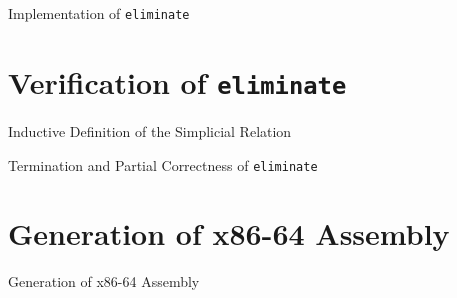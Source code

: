 \documentclass[aspectratio=169,xcolor=dvipsnames]{beamer}
\begin{document}
\begin{frame}{Implementation of \texttt{eliminate}}

\end{frame}

\section{Verification of \texttt{eliminate}}

\begin{frame}{Inductive Definition of the Simplicial Relation}

\end{frame}

\begin{frame}{Termination and Partial Correctness of \texttt{eliminate}}

\end{frame}

\section{Generation of x86-64 Assembly}

\begin{frame}{Generation of x86-64 Assembly}

\end{frame}




\end{document}
